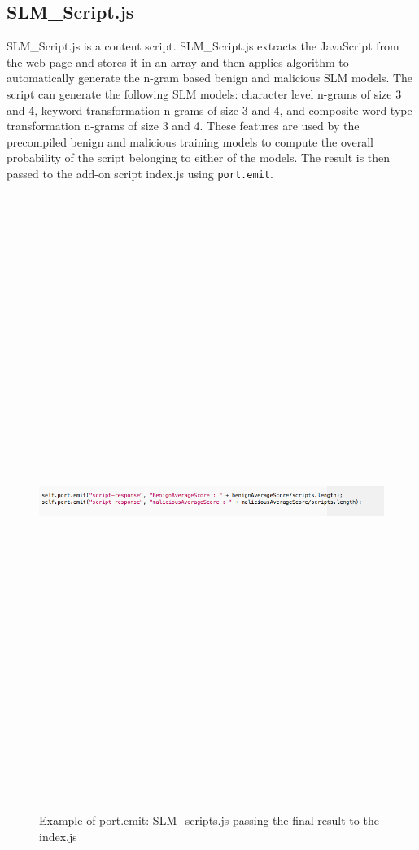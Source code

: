 \newpage

\subsection{SLM\_Script.js}

SLM\_Script.js is a content script. SLM\_Script.js extracts the JavaScript from the web page and stores it in an array and then applies algorithm to automatically generate the n-gram based benign and malicious SLM models. The script can generate the following SLM models: character level n-grams of size 3 and 4, keyword transformation n-grams of size 3 and 4, and composite word type transformation n-grams of size 3 and 4. These features are used by the precompiled benign and malicious training models to compute the overall probability of the script belonging to either of the models. The result is then passed to the add-on script index.js using \texttt{port.emit}.

\begin{figure}[htb]
\centering
\includegraphics[width=16cm,height=20cm,keepaspectratio]{image/port-emit.png}
\caption[Example of port.emit]{Example of port.emit: SLM\_scripts.js passing the final result to the index.js} 
\label{fig:port-emit}
\end{figure}

